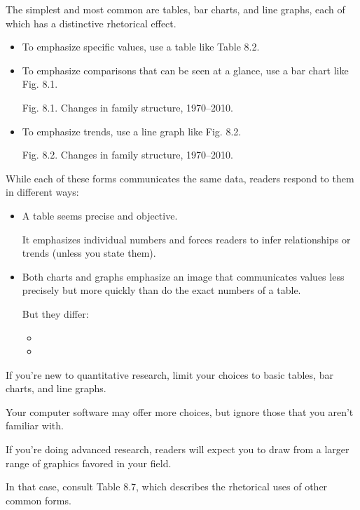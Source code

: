 \documentclass[oneside]{book}
\numberwithin{equation}{section}
\begin{document}
The simplest and most common are tables, bar charts, and line graphs, each of which has a distinctive rhetorical effect.
\begin{itemize}
    \item To emphasize specific values, use a table like Table 8.2.
    \item To emphasize comparisons that can be seen at a glance, use a bar chart like Fig. 8.1.
    
    \textsf{Fig. 8.1. Changes in family structure, 1970--2010.}
    \item To emphasize trends, use a line graph like Fig. 8.2.
    
    \textsf{Fig. 8.2. Changes in family structure, 1970--2010.}
\end{itemize}
While each of these forms communicates the same data, readers respond to them in different ways:
\begin{itemize}
    \item A table seems precise and objective.
    
    It emphasizes individual numbers and forces readers to infer relationships or trends (unless you state them).
    \item Both charts and graphs emphasize an image that communicates values less precisely but more quickly than do the exact numbers of a table.
    
    But they differ:
    \begin{itemize}
        \item {}
        \item {}
    \end{itemize}
\end{itemize}

%

If you're new to quantitative research, limit your choices to basic tables, bar charts, and line graphs.

Your computer software may offer more choices, but ignore those that you aren't familiar with.

%
If you're doing advanced research, readers will expect you to draw from a larger range of graphics favored in your field.

In that case, consult Table 8.7, which describes the rhetorical uses of other common forms.
\end{document}
